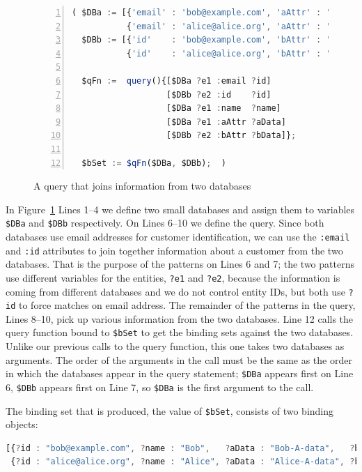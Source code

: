 \documentclass[10pt,letterpaper]{article} %
\newcommand{\stt}[1]{\texttt{#1}} %
\begin{document}
\begin{figure}[H]
    \caption{A query that joins information from two databases}
    \label{code:two-database-query}
\begin{lstlisting}[language=JavaScript,numberstyle=\scriptsize,basicstyle=\ttfamily\scriptsize,numbers=left,stepnumber=1,breaklines=true]
( $DBa := [{'email' : 'bob@example.com', 'aAttr' : 'Bob-A-data',   'name' : 'Bob'},
           {'email' : 'alice@alice.org', 'aAttr' : 'Alice-A-data', 'name' : 'Alice'}];
  $DBb := [{'id'    : 'bob@example.com', 'bAttr' : 'Bob-B-data'},
           {'id'    : 'alice@alice.org', 'bAttr' : 'Alice-B-data'}];

  $qFn :=  query(){[$DBa ?e1 :email ?id]
                   [$DBb ?e2 :id    ?id]
                   [$DBa ?e1 :name  ?name]
                   [$DBa ?e1 :aAttr ?aData]
                   [$DBb ?e2 :bAttr ?bData]};

  $bSet := $qFn($DBa, $DBb);  )
\end{lstlisting}
  \end{figure} \vspace{-2em}

  In Figure~\ref{code:two-database-query} Lines 1--4 we define two small databases and assign them to variables \stt{\$DBa} and \stt{\$DBb} respectively. On Lines 6--10 we define the query.
Since both databases use email addresses for customer identification, we can use the \stt{:email} and \stt{:id} attributes to join together information about a customer from the two databases.
That is the purpose of the patterns on Lines 6 and 7; the two patterns use different variables for the entities, \stt{?e1} and \stt{?e2},
because the information is coming from different databases and we do not control entity IDs, but both use \stt{?id} to force
matches on email address.
The remainder of the patterns in the query, Lines 8--10, pick up various information from the two databases.
Line 12 calls the query function bound to \stt{\$bSet} to get the binding sets against the two databases.
Unlike our previous calls to the query function, this one takes two databases as arguments.
The order of the arguments in the call must be the same as the order in which the databases appear in the query statement;
\stt{\$DBa} appears first on Line 6, \stt{\$DBb} appears first on Line 7, so \stt{\$DBa} is the first argument to the call.

The binding set that is produced, the value of \stt{\$bSet}, consists of two binding objects:

\begin{lstlisting}[language=JavaScript,numbers=none,basicstyle=\ttfamily\scriptsize]
[{?id : "bob@example.com", ?name : "Bob",   ?aData : "Bob-A-data",   ?bData : "Bob-B-data"  },
 {?id : "alice@alice.org", ?name : "Alice", ?aData : "Alice-A-data", ?bData : "Alice-B-data"}]
\end{lstlisting} \vspace{-2em}
\end{document}
